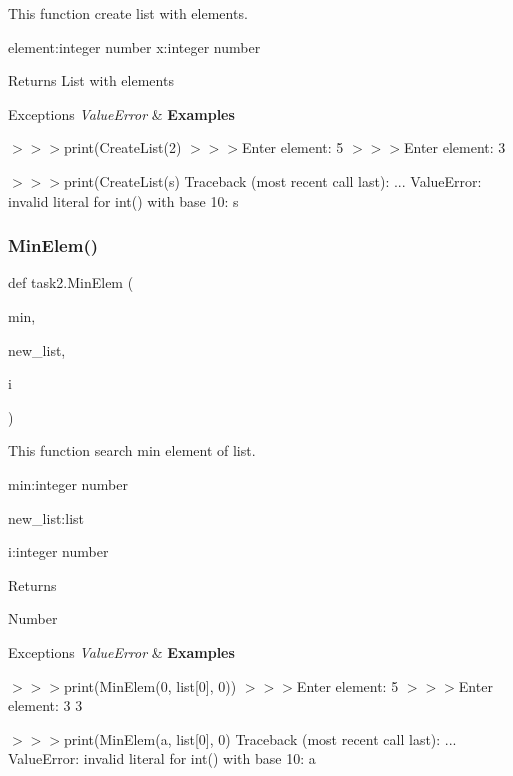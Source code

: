 This function create list with elements. 

element\+:integer number x\+:integer number

\begin{DoxyReturn}{Returns}
List with elements
\end{DoxyReturn}

\begin{DoxyExceptions}{Exceptions}
{\em Value\+Error} & {\bfseries Examples} 
\begin{DoxyCode}
\end{DoxyCode}
 $>$$>$$>$print(Create\+List(2) $>$$>$$>$Enter element\+: 5 $>$$>$$>$Enter element\+: 3 
\begin{DoxyCode}
[\textcolor{stringliteral}{'5'}, \textcolor{stringliteral}{'3'}]
\end{DoxyCode}
 $>$$>$$>$print(Create\+List(s) Traceback (most recent call last)\+: ... Value\+Error\+: invalid literal for int() with base 10\+: \textquotesingle{}s\textquotesingle{}  \\
\hline
\end{DoxyExceptions}
\mbox{\label{namespacetask2_a30f3f4371b7c47b28000cc60be60bf43}} 
\subsubsection{\texorpdfstring{Min\+Elem()}{MinElem()}}
{\footnotesize\ttfamily def task2.\+Min\+Elem (\begin{DoxyParamCaption}\item[{}]{min,  }\item[{}]{new\+\_\+list,  }\item[{}]{i }\end{DoxyParamCaption})}



This function search min element of list. 

min\+:integer number 
\begin{DoxyCode}
new\_list:list
\end{DoxyCode}
 i\+:integer number

\begin{DoxyReturn}{Returns}


Number
\end{DoxyReturn}

\begin{DoxyExceptions}{Exceptions}
{\em Value\+Error} & {\bfseries Examples} 
\begin{DoxyCode}
\end{DoxyCode}
 $>$$>$$>$print(\+Min\+Elem(0, list\mbox{[}0\mbox{]}, 0)) $>$$>$$>$Enter element\+: 5 $>$$>$$>$Enter element\+: 3 3\\
\hline
\end{DoxyExceptions}
$>$$>$$>$print(Min\+Elem(a, list\mbox{[}0\mbox{]}, 0) Traceback (most recent call last)\+: ... Value\+Error\+: invalid literal for int() with base 10\+: \textquotesingle{}a\textquotesingle{}  

